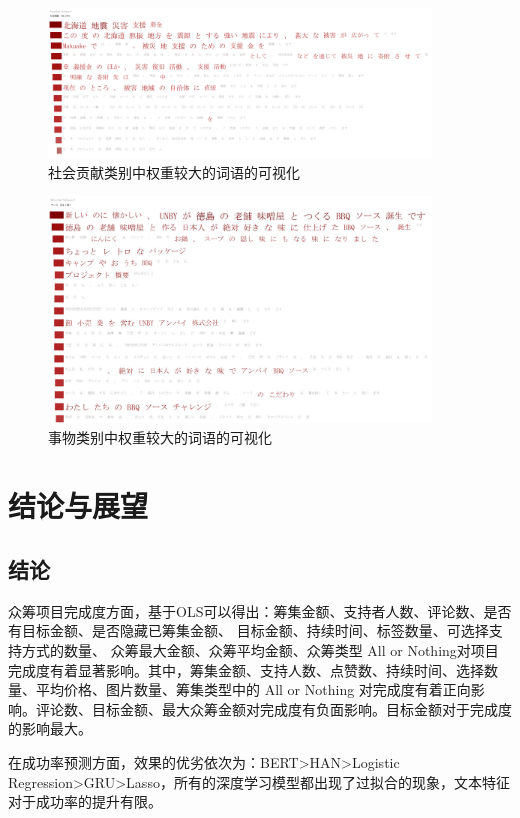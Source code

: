 \documentclass[lang=cn,a4paper]{elegantpaper}
\begin{document}
\begin{figure}[!htbp]
  \centering
  \includegraphics[width=4in]{image/18.jpg}
    \caption{社会贡献类别中权重较大的词语的可视化}
  \label{fig:category18}
\end{figure}

\begin{figure}[!htbp]
  \centering
  \includegraphics[width=4in]{image/9.jpg}
    \caption{事物类别中权重较大的词语的可视化}
  \label{fig:category9}
\end{figure}


\section{结论与展望}
\subsection{结论}
众筹项目完成度方面，基于OLS可以得出：筹集金额、支持者人数、评论数、是否有目标金额、是否隐藏已筹集金额、
目标金额、持续时间、标签数量、可选择支持方式的数量、
众筹最大金额、众筹平均金额、众筹类型 All or Nothing对项目完成度有着显著影响。其中，筹集金额、支持人数、点赞数、持续时间、选择数量、平均价格、图片数量、筹集类型中的 All or Nothing 对完成度有着正向影响。评论数、目标金额、最大众筹金额对完成度有负面影响。目标金额对于完成度的影响最大。

在成功率预测方面，效果的优劣依次为：BERT>HAN>Logistic Regression>GRU>Lasso，所有的深度学习模型都出现了过拟合的现象，文本特征对于成功率的提升有限。
\end{document}
